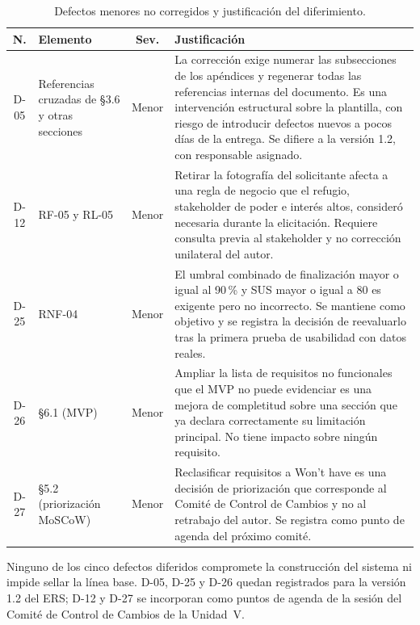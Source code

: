 \documentclass[journal,onecolumn]{IEEEtran}
\begin{document}
	\begin{table}[h!]
		\centering
		\caption{Defectos menores no corregidos y justificación del diferimiento.}
		\label{tab:defectos-diferidos}
		\begin{tabular}{
				|c
				|>{\raggedright\arraybackslash}p{3cm}
				|c
				|>{\raggedright\arraybackslash}p{7.5cm}|
			}
			\hline
			\textbf{N.\textordmasculine{}} & \textbf{Elemento} & \textbf{Sev.} & \textbf{Justificación} \\
			\hline
			D-05 & Referencias cruzadas de \S3.6 y otras secciones & Menor &
			La corrección exige numerar las subsecciones de los
			apéndices y regenerar todas las referencias internas del
			documento. Es una intervención estructural sobre la plantilla, con
			riesgo de introducir defectos nuevos a pocos días de la entrega.
			Se difiere a la versión 1.2, con responsable asignado. \\
			\hline
			D-12 & RF-05 y RL-05 & Menor &
			Retirar la fotografía del solicitante afecta a una regla de
			negocio que el refugio, stakeholder de poder e interés altos,
			consideró necesaria durante la elicitación. Requiere consulta
			previa al stakeholder y no corrección unilateral del autor. \\
			\hline
			D-25 & RNF-04 & Menor &
			El umbral combinado de finalización mayor o igual al
			90\,\% y SUS mayor o igual a 80 es exigente pero no incorrecto. Se
			mantiene como objetivo y se registra la decisión de reevaluarlo
			tras la primera prueba de usabilidad con datos reales. \\
			\hline
			D-26 & \S6.1 (MVP) & Menor &
			Ampliar la lista de requisitos no funcionales que el MVP no
			puede evidenciar es una mejora de completitud sobre una sección
			que ya declara correctamente su limitación principal. No tiene
			impacto sobre ningún requisito. \\
			\hline
			D-27 & \S5.2 (priorización MoSCoW) & Menor &
			Reclasificar requisitos a Won't have es una decisión de
			priorización que corresponde al Comité de Control de Cambios y no
			al retrabajo del autor. Se registra como punto de agenda del
			próximo comité. \\
			\hline
		\end{tabular}
	\end{table}
	
	Ninguno de los cinco defectos diferidos compromete la construcción del
	sistema ni impide sellar la línea base. D-05, D-25 y D-26 quedan
	registrados para la versión 1.2 del ERS; D-12 y D-27 se incorporan como
	puntos de agenda de la sesión del Comité de Control de Cambios de la
	Unidad~V.
	
\end{document}
